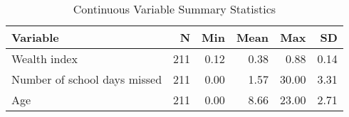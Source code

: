 \begin{table}[!t]
\caption*{
{\large Continuous Variable Summary Statistics}
} 
\fontsize{12.0pt}{14.4pt}\selectfont
\begin{tabular*}{\linewidth}{@{\extracolsep{\fill}}lrrrrr}
\toprule
Variable & N & Min & Mean & Max & SD \\ 
\midrule\addlinespace[2.5pt]
Wealth index & 211 & 0.12 & 0.38 & 0.88 & 0.14 \\ 
Number of school days missed & 211 & 0.00 & 1.57 & 30.00 & 3.31 \\ 
Age & 211 & 0.00 & 8.66 & 23.00 & 2.71 \\ 
\bottomrule
\end{tabular*}
\end{table}

